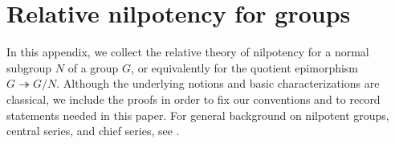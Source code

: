 
\appendix
{}

\renewcommand{\thesection}{\Alph{section}}
\renewcommand{\thesubsection}{\thesection.\arabic{subsection}}
\renewcommand{\theHsection}{\Alph{section}}
\renewcommand{\theHsubsection}{\theHsection.\arabic{subsection}}

\section{Relative nilpotency for groups}
\label{appendix: relative nilpotency for groups}

In this appendix, we collect the relative theory of nilpotency for a normal subgroup $N$ of a group $G$, or equivalently for the quotient epimorphism $G\twoheadrightarrow G/N$.
Although the underlying notions and basic characterizations are classical, we include the proofs in order to fix our conventions and to record statements needed in this paper.
For general background on nilpotent groups, central series, and chief series, see \cite{book_robinson_1982_a_course_in_the_theory_of_groups}.


